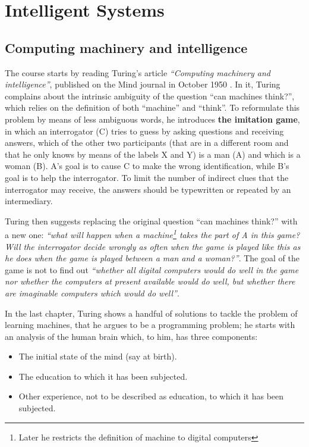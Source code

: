 \chapter{Intelligent Systems}
\section{Computing machinery and intelligence}
The course starts by reading Turing's article \textit{``Computing machinery and intelligence''}, published on the Mind journal in October 1950 \cite{10.1093/mind/LIX.236.433}. In it, Turing complains about the intrinsic ambiguity of the question ``can machines think?'', which relies on the definition of both ``machine'' and ``think''. To reformulate this problem by means of less ambiguous words, he introduces \textbf{the imitation game}, in which an interrogator (C) tries to guess by asking questions and receiving answers, which of the other two participants (that are in a different room and that he only knows by means of the labels X and Y) is a man (A) and which is a woman (B). A's goal is to cause C to make the wrong identification, while B's goal is to help the interrogator. To limit the number of indirect clues that the interrogator may receive, the answers should be typewritten or repeated by an intermediary.

Turing then suggests replacing the original question ``can machines think?'' with a new one: \textit{``what will happen when a machine\footnote{Later he restricts the definition of machine to digital computers} takes the part of A in this game? Will the interrogator decide wrongly as often when the game is played like this as he does when the game is played between a man and a woman?''}. The goal of the game is not to find out \textit{``whether all digital computers would do well in the game nor whether the computers at present available would do well, but whether there are imaginable computers which would do well''}.

In the last chapter, Turing shows a handful of solutions to tackle the problem of learning machines, that he argues to be a programming problem; he starts with an analysis of the human brain which, to him, has three components:

\begin{itemize}
    \item The initial state of the mind (say at birth).
    \item The education to which it has been subjected.
    \item Other experience, not to be described as education, to which it has been subjected.
\end{itemize}

